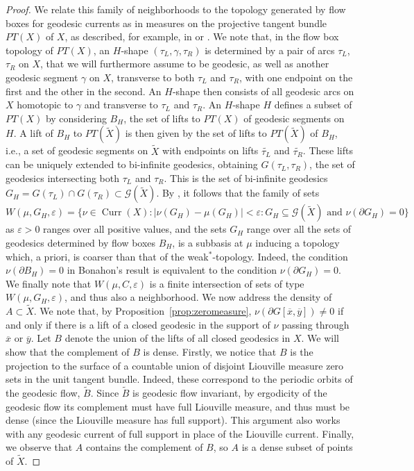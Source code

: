 \documentclass[12pt,article]{amsart}
\numberwithin{equation}{section}
\numberwithin{figure}{section}
\theoremstyle{definition}
\theoremstyle{plain}
\DeclareMathOperator{\Curr}{Curr}
\newcommand*{\wt}[1]{\widetilde{#1}}
\renewcommand{\epsilon}{\varepsilon}
\begin{document}
\begin{proof}
We relate this family of neighborhoods to the topology generated by flow boxes for geodesic currents as in measures on the projective tangent bundle $PT(X)$ of $X$, as described, for example, in \cite[Lemma~3.4.4]{AL17:HyperbolicStructures} or \cite{Bonahon86:EndsHyperbolicManifolds}.
We note that, in the flow box topology of $PT(X)$, an $H$-shape $(\tau_L,\gamma,\tau_R)$ is determined by a pair of arcs $\tau_L$, $\tau_R$ on $X$, that we will furthermore assume to be geodesic, as well as another geodesic segment $\gamma$ on $X$, transverse to both $\tau_L$ and $\tau_R$, with one endpoint on the first and the other in the second. An $H$-shape then consists of all geodesic arcs on $X$ homotopic to $\gamma$ and transverse to $\tau_L$ and $\tau_R$.
An $H$-shape $H$ defines a subset of $PT(X)$ by considering $B_H$, the set of lifts to $PT(X)$ of  geodesic segments on $H$. A lift of $B_H$ to $PT(\wt{X})$ is then given by the set of lifts to $PT(\wt{X})$ of $B_H$, i.e., a set of geodesic segments on $\wt{X}$ with endpoints on lifts $\wt{\tau_L}$ and $\wt{\tau_R}$. These lifts can be uniquely extended to bi-infinite geodesics, obtaining $G(\tau_L,\tau_R)$, the set of geodesics intersecting both $\tau_L$ and $\tau_R$.
This is the set of bi-infinite geodesics
$G_H=G(\tau_L) \cap G(\tau_R) \subset \mathcal{G}(\wt{X})$.
By \cite[Lemma~4.2]{Bonahon86:EndsHyperbolicManifolds}, it follows that the family of sets
\[
W(\mu,G_H,\epsilon)=\{ \nu \in \Curr(X) : |\nu(G_H)-\mu(G_H)| < \epsilon \colon G_H \subseteq \mathcal{G}(\wt{X}) \text{ and } \nu(\partial G_H) = 0 \}
\]
as $\epsilon>0$ ranges over all positive values, and the sets $G_H$ range over all the sets of geodesics determined by flow boxes $B_H$, is a subbasis at $\mu$ inducing a topology which, a priori, is coarser than that of the weak$^*$-topology. Indeed, the condition $\nu(\partial B_H)=0$ in Bonahon's result is equivalent to the condition $\nu(\partial G_H) = 0$.
We finally note that $W(\mu, C, \epsilon)$ is a finite intersection of sets of type $W(\mu,G_H,\epsilon)$, and thus also a neighborhood. We now address the density of $A \subset \wt{X}$. We note that, by Proposition~\ref{prop:zeromeasure}, $\nu(\partial G[\overline{x},\overline{y}]) \neq 0$ if and only if there is a lift of a closed geodesic in the support of $\nu$ passing through $\overline{x}$ or $\overline{y}$. Let $B$ denote the union of the lifts of all closed geodesics in $X$. We will show that the complement of $B$ is dense. Firstly, we notice that $B$ is the projection to the surface of a countable union of disjoint Liouville measure zero sets in the unit tangent bundle. Indeed, these correspond to the periodic orbits of the geodesic flow, $\tilde{B}$. Since $\tilde{B}$ is geodesic flow invariant, by ergodicity of the geodesic flow its complement must have full Liouville measure, and thus must be dense (since the Liouville measure has full support). This argument also works with any geodesic current of full support in place of the Liouville current.
Finally, we observe that $A$ contains the complement of $B$, so $A$ is a dense subset of points of $\wt{X}$.
\end{proof}
\end{document}
